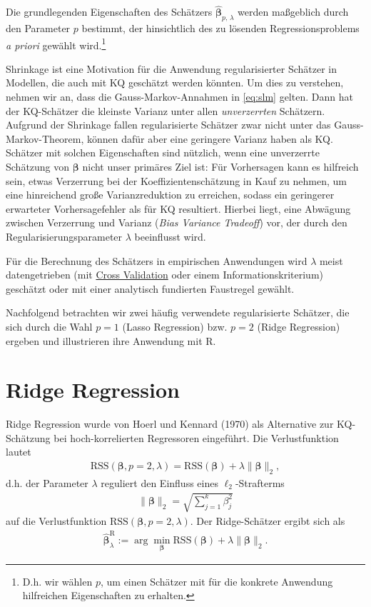 \documentclass[
  a4paper,
  DIV=11,
  oneside]{scrreprt}
\begin{document}
Die grundlegenden Eigenschaften des Schätzers
\(\widehat{\boldsymbol{\beta}}_{p,\,\lambda}\) werden maßgeblich durch
den Parameter \(p\) bestimmt, der hinsichtlich des zu lösenden
Regressionsproblems \emph{a priori} gewählt wird.\footnote{D.h. wir
  wählen \(p\), um einen Schätzer mit für die konkrete Anwendung
  hilfreichen Eigenschaften zu erhalten.}

Shrinkage ist eine Motivation für die Anwendung regularisierter Schätzer
in Modellen, die auch mit KQ geschätzt werden könnten. Um dies zu
verstehen, nehmen wir an, dass die Gauss-Markov-Annahmen in
\eqref{eq:slm} gelten. Dann hat der KQ-Schätzer die kleinste Varianz
unter allen \emph{unverzerrten} Schätzern. Aufgrund der Shrinkage fallen
regularisierte Schätzer zwar nicht unter das Gauss-Markov-Theorem,
können dafür aber eine geringere Varianz haben als KQ. Schätzer mit
solchen Eigenschaften sind nützlich, wenn eine unverzerrte Schätzung von
\(\boldsymbol{\beta}\) nicht unser primäres Ziel ist: Für Vorhersagen
kann es hilfreich sein, etwas Verzerrung bei der Koeffizientenschätzung
in Kauf zu nehmen, um eine hinreichend große Varianzreduktion zu
erreichen, sodass ein geringerer erwarteter Vorhersagefehler als für KQ
resultiert. Hierbei liegt, eine Abwägung zwischen Verzerrung und Varianz
(\emph{Bias Variance Tradeoff}) vor, der durch den
Regularisierungsparameter \(\lambda\) beeinflusst wird.

Für die Berechnung des Schätzers in empirischen Anwendungen wird
\(\lambda\) meist datengetrieben (mit
\href{https://de.wikipedia.org/wiki/Kreuzvalidierungsverfahren}{Cross
Validation} oder einem Informationskriterium) geschätzt oder mit einer
analytisch fundierten Faustregel gewählt.

Nachfolgend betrachten wir zwei häufig verwendete regularisierte
Schätzer, die sich durch die Wahl \(p=1\) (Lasso Regression) bzw.
\(p=2\) (Ridge Regression) ergeben und illustrieren ihre Anwendung mit
R.

\section{Ridge Regression}\label{ridge-regression}

Ridge Regression wurde von Hoerl und Kennard (1970) als Alternative zur
KQ-Schätzung bei hoch-korrelierten Regressoren eingeführt. Die
Verlustfunktion lautet \begin{align}
  \mathrm{RSS}(\boldsymbol{\beta},p=2,\lambda) = \mathrm{RSS}(\boldsymbol{\beta}) + \lambda \lVert\boldsymbol{\beta}\rVert_2,\label{eq:ridgeloss}
\end{align} d.h. der Parameter \(\lambda\) reguliert den Einfluss eines
\(\ell_2\)-Strafterms \begin{align*}
  \lVert\boldsymbol{\beta}\rVert_2 = \sqrt{\sum_{j=1}^k\beta_j^2}
\end{align*} auf die Verlustfunktion
\(\mathrm{RSS}(\boldsymbol{\beta},p=2,\lambda)\). Der Ridge-Schätzer
ergibt sich als \begin{align}
  \widehat{\boldsymbol{\beta}}^{\mathrm{R}}_\lambda := \arg\min_{\boldsymbol{\beta}}\mathrm{RSS}(\boldsymbol{\beta}) + \lambda \lVert\boldsymbol{\beta}\rVert_2.\label{eq:ridgereg}
\end{align}
\end{document}
